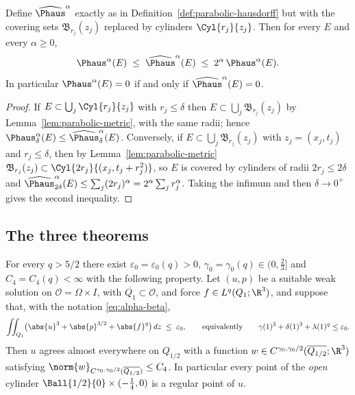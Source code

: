 \documentclass[11pt,reqno]{amsart}
\begin{document}
\begin{lemma}\label{lem:P1-cylinders}
Define $\widehat{\Phaus}^{\alpha}$ exactly as in
Definition~\ref{def:parabolic-hausdorff} but with the covering sets
$\mathfrak{B}_{r_{j}}(z_{j})$ replaced by cylinders $\Cyl{r_{j}}{z_{j}}$. Then
for every $E$ and every $\alpha\ge0$,
\[
  \Phaus^{\alpha}(E)\;\le\;\widehat{\Phaus}^{\alpha}(E)
  \;\le\;2^{\alpha}\,\Phaus^{\alpha}(E) .
\]
In particular $\Phaus^{\alpha}(E)=0$ if and only if
$\widehat{\Phaus}^{\alpha}(E)=0$.
\end{lemma}

\begin{proof}
If $E\subset\bigcup_{j}\Cyl{r_{j}}{z_{j}}$ with $r_{j}\le\delta$ then
$E\subset\bigcup_{j}\mathfrak{B}_{r_{j}}(z_{j})$ by
Lemma~\ref{lem:parabolic-metric}, with the same radii; hence
$\Phaus^{\alpha}_{\delta}(E)\le\widehat{\Phaus}^{\alpha}_{\delta}(E)$.
Conversely, if $E\subset\bigcup_{j}\mathfrak{B}_{r_{j}}(z_{j})$ with
$z_{j}=(x_{j},t_{j})$ and $r_{j}\le\delta$, then by
Lemma~\ref{lem:parabolic-metric}
$\mathfrak{B}_{r_{j}}(z_{j})\subset\Cyl{2r_{j}}{(x_{j},t_{j}+r_{j}^{2})}$, so
$E$ is covered by cylinders of radii $2r_{j}\le2\delta$ and
$\widehat{\Phaus}^{\alpha}_{2\delta}(E)\le\sum_{j}(2r_{j})^{\alpha}
 =2^{\alpha}\sum_{j}r_{j}^{\alpha}$. Taking the infimum and then
$\delta\to0^{+}$ gives the second inequality.
\end{proof}

\subsection{The three theorems}\label{ss:main-theorems}

\begin{theorem}\label{thm:A}
For every $q>5/2$ there exist $\varepsilon_{0}=\varepsilon_{0}(q)>0$,
$\gamma_{0}=\gamma_{0}(q)\in(0,\tfrac23]$ and $C_{4}=C_{4}(q)<\infty$ with the
following property. Let $(u,p)$ be a suitable weak solution on
$\mathcal{O}=\Omega\times I$, with $\overline{Q_{1}}\subset\mathcal{O}$, and force $f\in L^{q}(Q_{1};\R^{3})$, and
suppose that, with the notation \eqref{eq:alpha-beta},
\begin{equation}\label{eq:thmA-hyp}
  \iint_{Q_{1}}\bigl(\abs{u}^{3}+\abs{p}^{3/2}+\abs{f}^{q}\bigr)\,dz
  \;\le\;\varepsilon_{0},
  \qquad\text{equivalently}\qquad
  \gamma(1)^{3}+\delta(1)^{3}+\lambda(1)^{q}\le\varepsilon_{0}.
\end{equation}
Then $u$ agrees almost everywhere on $Q_{1/2}$ with a function
$w\in C^{\gamma_{0},\gamma_{0}/2}(\overline{Q_{1/2}};\R^{3})$ satisfying
$\norm{w}_{C^{\gamma_{0},\gamma_{0}/2}(\overline{Q_{1/2}})}\le C_{4}$. In
particular every point of the \emph{open} cylinder
$\Ball{1/2}{0}\times(-\tfrac14,0)$ is a regular point of $u$.
\end{theorem}
\end{document}
